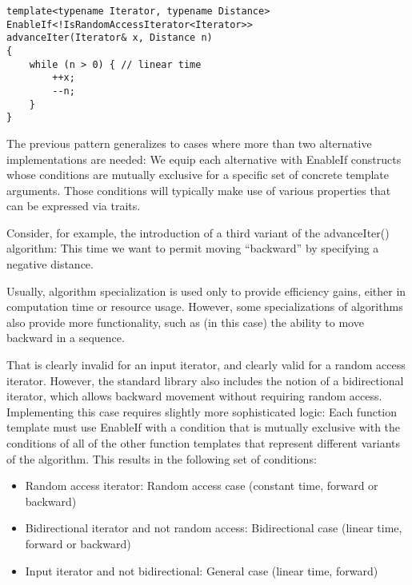\begin{lstlisting}[style=styleCXX]
template<typename Iterator, typename Distance>
EnableIf<!IsRandomAccessIterator<Iterator>>
advanceIter(Iterator& x, Distance n)
{
	while (n > 0) { // linear time
		++x;
		--n;
	}
}
\end{lstlisting}


The previous pattern generalizes to cases where more than two   alternative implementations are needed: We equip each alternative with EnableIf constructs whose conditions are mutually exclusive for a specific set of concrete template arguments. Those conditions will typically make use of various properties that can be expressed via traits.

Consider, for example, the introduction of a third variant of the advanceIter() algorithm: This time we want to permit moving “backward” by specifying a negative distance.

\begin{tcolorbox}[colback=webgreen!5!white,colframe=webgreen!75!black]
\hspace*{0.75cm}Usually, algorithm specialization is used only to provide efficiency gains, either in computation time or resource usage. However, some specializations of algorithms also provide more functionality, such as (in this case) the ability to move backward in a sequence.
\end{tcolorbox}

That is clearly invalid for an input iterator, and clearly valid for a random access iterator. However, the standard library also includes the notion of a bidirectional iterator, which allows backward movement without requiring random access. Implementing this case requires slightly more sophisticated logic: Each function template must use EnableIf with a condition that is mutually exclusive with the conditions of all of the other function templates that represent different variants of the algorithm. This results in the following set of conditions:

\begin{itemize}
\item 
Random access iterator: Random access case (constant time, forward or backward)

\item
Bidirectional iterator and not random access: Bidirectional case (linear time, forward or backward)

\item
Input iterator and not bidirectional: General case (linear time, forward)
\end{itemize}

